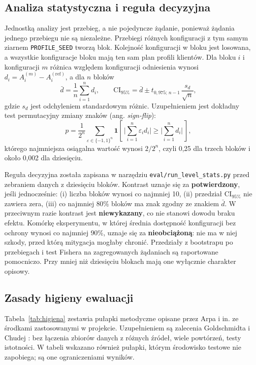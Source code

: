 \documentclass[a4paper,12pt]{article}
\begin{document}
\subsection{Analiza statystyczna i reguła decyzyjna}\label{sec:statystyka}
Jednostką analizy jest przebieg, a nie pojedyncze żądanie, ponieważ żądania jednego przebiegu nie są niezależne. Przebiegi różnych konfiguracji z tym samym ziarnem \texttt{PROFILE\_SEED} tworzą blok. Kolejność konfiguracji w bloku jest losowana, a wszystkie konfiguracje bloku mają ten sam plan profili klientów. Dla bloku $i$ i konfiguracji $m$ różnica względem konfiguracji odniesienia wynosi $d_i = A_i^{(m)} - A_i^{(\mathrm{ref})}$, a dla $n$ bloków
\begin{equation}
\bar{d} = \frac{1}{n}\sum_{i=1}^{n} d_i, \qquad
\mathrm{CI}_{95\%} = \bar{d} \pm t_{0{,}975;\,n-1}\,\frac{s_d}{\sqrt{n}},
\end{equation}
gdzie $s_d$ jest odchyleniem standardowym różnic. Uzupełnieniem jest dokładny test permutacyjny zmiany znaków (ang. \textit{sign-flip}):
\begin{equation}
p = \frac{1}{2^n}\sum_{\varepsilon \in \{-1,1\}^n} \mathbf{1}\!\left[\,\Big|\sum_{i=1}^{n} \varepsilon_i d_i\Big| \geq \Big|\sum_{i=1}^{n} d_i\Big|\,\right],
\end{equation}
którego najmniejsza osiągalna wartość wynosi $2/2^n$, czyli 0,25 dla trzech bloków i około 0,002 dla dziesięciu.

Reguła decyzyjna została zapisana w narzędziu \texttt{eval/run\_level\_stats.py} przed zebraniem danych z dziesięciu bloków. Kontrast uznaje się za \textbf{potwierdzony}, jeśli jednocześnie: (i) liczba bloków wynosi co najmniej 10, (ii) przedział $\mathrm{CI}_{95\%}$ nie zawiera zera, (iii) co najmniej 80\% bloków ma znak zgodny ze znakiem $\bar{d}$. W przeciwnym razie kontrast jest \textbf{niewykazany}, co nie stanowi dowodu braku efektu. Komórkę eksperymentu, w której średnia dostępność konfiguracji bez ochrony wynosi co najmniej 90\%, uznaje się za \textbf{nieobciążoną}: nie ma w niej szkody, przed którą mitygacja mogłaby chronić. Przedziały z bootstrapu po przebiegach i test Fishera na zagregowanych żądaniach są raportowane pomocniczo. Przy mniej niż dziesięciu blokach mają one wyłącznie charakter opisowy.

\subsection{Zasady higieny ewaluacji}\label{sec:higiena}
Tabela~\ref{tab:higiena} zestawia pułapki metodyczne opisane przez Arpa i in. \cite{arp2022dos} ze środkami zastosowanymi w projekcie. Uzupełnieniem są zalecenia Goldschmidta i Chudej \cite{goldschmidt2025network}: bez łączenia zbiorów danych z różnych źródeł, wiele powtórzeń, testy istotności. W tabeli wskazano również pułapki, którym środowisko testowe nie zapobiega; są one ograniczeniami wyników.
\end{document}
